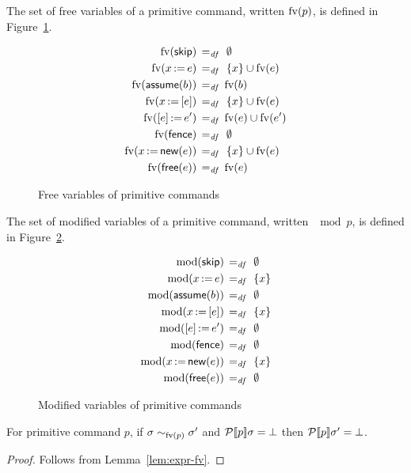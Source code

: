 \documentclass[11pt]{report}
\begin{document}
The set of free variables of a primitive command, written $\fv{p}$, is defined in Figure~\ref{fig:fvpcomm}. 

\begin{figure}[h]
	\centering
	\begin{align*}
		\fv{\cskip} \eqdef {} & \nil \\ 
		\fv{\cassign{x}{e}} \eqdef {} & \set{x} \cup \fv{e} \\ 
		\fv{\cassume{b}} \eqdef {} & \fv{b} \\ 
		\fv{\cload{x}{e}} \eqdef {} & \set{x} \cup \fv{e} \\ 
		\fv{\cstore{e}{e'}} \eqdef {} & \fv{e} \cup \fv{e'} \\ 
		\fv{\cfence} \eqdef {} & \nil \\
		\fv{\cnew{x}{e}} \eqdef {} & \set{x} \cup \fv{e} \\ 
		\fv{\cfree{e}} \eqdef {} & \fv{e}
 	\end{align*}
	\caption{Free variables of primitive commands}
	\label{fig:fvpcomm}
\end{figure}

The set of modified variables of a primitive command, written $\mod{p}$, is defined in Figure~\ref{fig:modpcomm}. 

\begin{figure}[h]
	\centering
	\begin{align*}
		\mod{\cskip} \eqdef {} & \nil \\ 
		\mod{\cassign{x}{e}} \eqdef {} & \set{x} \\ 
		\mod{\cassume{b}} \eqdef {} & \nil \\ 
		\mod{\cload{x}{e}} \eqdef {} & \set{x} \\ 
		\mod{\cstore{e}{e'}} \eqdef {} & \nil \\ 
		\mod{\cfence} \eqdef {} & \nil \\
		\mod{\cnew{x}{e}} \eqdef {} & \set{x} \\ 
		\mod{\cfree{e}} \eqdef {} & \nil
 	\end{align*}
	\caption{Modified variables of primitive commands}
	\label{fig:modpcomm}
\end{figure}

\begin{lemma}
	\label{lem:pcomm-fv-abort}
	For primitive command $p$, if $\sigma \stcong{\fv{p}} \sigma'$ and $\dnpcomm{p}\sigma = \bot$ then $\dnpcomm{p}\sigma' = \bot$. 
\end{lemma}

\begin{proof}
	Follows from Lemma~\ref{lem:expr-fv}. 
\end{proof}
\end{document}
